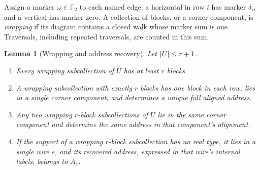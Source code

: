 \documentclass[11pt]{article}
\newtheorem{lemma}[theorem]{Lemma}
\theoremstyle{definition}
\newcommand{\F}{\mathbb F_2}
\DeclarePairedDelimiter{\abs}{\lvert}{\rvert}
\begin{document}
Assign a marker \(\omega\in\F\) to each named edge: a horizontal in row
\(i\) has marker \(\delta_i\), and a vertical has marker zero.
A collection of blocks, or a corner component, is \emph{wrapping} if its
diagram contains a closed walk whose marker sum is one. Traversals,
including repeated traversals, are counted in this sum.

\begin{lemma}[Wrapping and address recovery]
\label{offset:lem-wrapping}
Let \(\abs{U}\le r+1\).
\begin{enumerate}
 \item Every wrapping subcollection of \(U\) has at least \(r\) blocks.
 \item A wrapping subcollection with exactly \(r\) blocks has one block
 in each row, lies in a single corner component, and determines a unique
 full aligned address.
 \item Any two wrapping \(r\)-block subcollections of \(U\) lie in the
 same corner component and determine the same address in that
 component's alignment.
 \item If the support of a wrapping \(r\)-block subcollection has no real
 type, it lies in a single wire \(e\), and its recovered address,
 expressed in that wire's internal labels, belongs to \(A_e\).
\end{enumerate}
\end{lemma}
\end{document}
